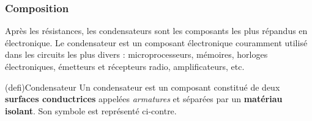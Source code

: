 \documentclass[../../main/main.tex]{subfiles}
\begin{document}
\subsubsection{Composition}

Après les résistances, les condensateurs sont les composants les plus répandus
en électronique. Le condensateur est un composant électronique couramment
utilisé dans les circuits les plus divers : microprocesseurs, mémoires, horloges
électroniques, émetteurs et récepteurs radio, amplificateurs, etc.

\begin{tcb}[label=def:condens, sidebyside, righthand ratio=.3](defi){Condensateur}
	Un condensateur est un composant constitué de deux \textbf{surfaces
		conductrices} appelées \textit{armatures} et séparées par un
	\textbf{matériau isolant}. Son symbole est représenté ci-contre.
	\tcblower
	\begin{center}
	\end{center}
\end{tcb}
\end{document}
